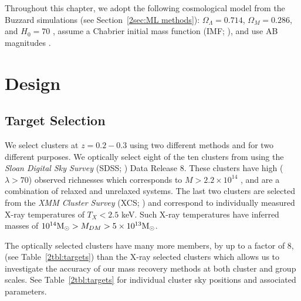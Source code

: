 Throughout this chapter, we adopt the following cosmological model from the Buzzard simulations (see Section~\ref{2sec:ML methods}): $\Omega_\Lambda = 0.714$, $\Omega_M = 0.286$, and $H_0= 70$ \kms \mpc, assume a Chabrier initial mass function (IMF; \citealt{Chabrier2003}), and use AB magnitudes \citep{Oke1974}.

\section{Design}\label{2sec:design} 
\subsection{Target Selection}\label{2sec:selection} 
We select clusters at $z=0.2-0.3$ using two different methods and for two different purposes. We optically select eight of the ten clusters from \cite{Rykoff2012} using the \textit{Sloan Digital Sky Survey} (SDSS; \citealt{Blanton2001a}) Data Release 8. These clusters have high ($\lambda>70$) observed richnesses which corresponds to $M > 2.2\times10^{14}$ \Msol, and are a combination of relaxed and unrelaxed systems. The last two clusters are selected from the \textit{XMM Cluster Survey} (XCS; \citealt{Mehrtens2012}) and correspond to individually measured X-ray temperatures of $T_X < 2.5$ keV. Such X-ray temperatures have inferred masses of $10^{14}\hbox{$\mathrm{M}_\odot$} > M_{DM} > 5\times10^{13}\hbox{$\mathrm{M}_\odot$}$.

The optically selected clusters have many more members, by up to a factor of 8, (see Table~\ref{2tbl:targets}) than the X-ray selected clusters which allows us to investigate the accuracy of our mass recovery methods at both cluster and group scales. See Table~\ref{2tbl:targets} for individual cluster sky positions and associated parameters. 


